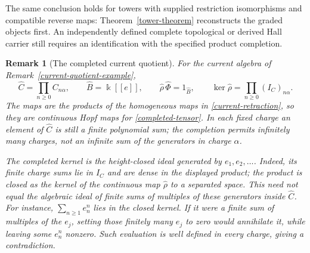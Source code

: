 \documentclass[11pt]{article}
\newtheorem{remark}[theorem]{Remark}
\newcommand{\kk}{\Bbbk}
\begin{document}
The same conclusion holds for towers with supplied restriction
isomorphisms and compatible reverse maps: Theorem~\ref{tower-theorem}
reconstructs the graded objects first. An independently defined complete
topological or derived Hall carrier still requires an identification with
the specified product completion.

\begin{remark}[The completed current quotient]
\label{completed-current-quotient}
For the current algebra of Remark~\ref{current-quotient-example},
\[
 \widehat C=\prod_{n\geq0}C_{n\alpha},\qquad
 \widehat B=\kk[[e]],\qquad
 \widehat\rho\,\widehat\Phi=1_{\widehat B},\qquad
 \ker\widehat\rho=\prod_{n\geq0}(I_C)_{n\alpha}.
\]
The maps are the products of the homogeneous maps in
\eqref{current-retraction}, so they are continuous Hopf maps for
\eqref{completed-tensor}. In each fixed charge an element of $\widehat C$
is still a finite polynomial sum; the completion permits infinitely many
charges, not an infinite sum of the generators in charge $\alpha$.

The completed kernel is the height-closed ideal generated by
$e_1,e_2,\ldots$. Indeed, its finite charge sums lie in $I_C$ and are
dense in the displayed product; the product is closed as the kernel of
the continuous map $\widehat\rho$ to a separated space.
This need not equal the algebraic ideal of finite sums of multiples of
these generators inside $\widehat C$. For instance,
$\sum_{n\geq1}e_n^n$ lies in the closed kernel. If it were a finite sum
of multiples of the $e_j$, setting those finitely many $e_j$ to zero
would annihilate it, while leaving some $e_n^n$ nonzero. Such evaluation
is well defined in every charge, giving a contradiction.


\end{remark}
\end{document}

